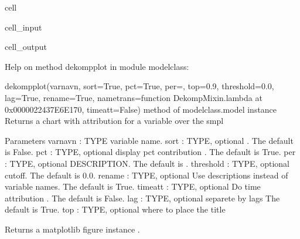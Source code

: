 \documentclass[letterpaper,10pt,english]{jupyterBook}
\begin{document}
\begin{sphinxuseclass}{cell}\begin{sphinxVerbatimInput}

\begin{sphinxuseclass}{cell_input}
\begin{sphinxVerbatim}[commandchars=\\\{\}]
\end{sphinxVerbatim}

\end{sphinxuseclass}\end{sphinxVerbatimInput}
\begin{sphinxVerbatimOutput}

\begin{sphinxuseclass}{cell_output}
\begin{sphinxVerbatim}[commandchars=\\\{\}]
Help on method dekomp\PYGZus{}plot in module modelclass:

dekomp\PYGZus{}plot(varnavn, sort=True, pct=True, per=\PYGZsq{}\PYGZsq{}, top=0.9, threshold=0.0, lag=True, rename=True, nametrans=\PYGZlt{}function Dekomp\PYGZus{}Mixin.\PYGZlt{}lambda\PYGZgt{} at 0x0000022437E6E170\PYGZgt{}, time\PYGZus{}att=False) method of modelclass.model instance
    Returns  a chart with attribution for a variable over the smpl  
    
    Parameters
    \PYGZhy{}\PYGZhy{}\PYGZhy{}\PYGZhy{}\PYGZhy{}\PYGZhy{}\PYGZhy{}\PYGZhy{}\PYGZhy{}\PYGZhy{}
    varnavn : TYPE
        variable name.
    sort : TYPE, optional
        . The default is False.
    pct : TYPE, optional
        display pct contribution . The default is True.
    per : TYPE, optional
        DESCRIPTION. The default is \PYGZsq{}\PYGZsq{}.
    threshold : TYPE, optional
        cutoff. The default is 0.0.
    rename : TYPE, optional
        Use descriptions instead of variable names. The default is True.
    time\PYGZus{}att : TYPE, optional
        Do time attribution . The default is False.
    lag : TYPE, optional
       separete by lags The default is True.           
    top : TYPE, optional
      where to place the title 
       
    
    Returns
    \PYGZhy{}\PYGZhy{}\PYGZhy{}\PYGZhy{}\PYGZhy{}\PYGZhy{}\PYGZhy{}
    a matplotlib figure instance .
\end{sphinxVerbatim}

\end{sphinxuseclass}\end{sphinxVerbatimOutput}

\end{sphinxuseclass}
\end{document}
